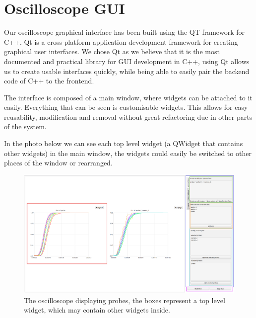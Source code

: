 \section{Oscilloscope GUI}
    Our oscilloscope graphical interface has been built using the QT framework for C++. Qt is a cross-platform application development framework for creating graphical user interfaces. \cite{qt-w} 
    We chose Qt as we believe that it is the most documented and practical library for GUI development in C++, using Qt allows us to create usable interfaces quickly, while being able to easily pair the backend code of C++ to the frontend.

    The interface is composed of a main window, where widgets can be attached to it easily. Everything that can be seen is customisable widgets. This allows for easy reusability, modification and removal without great refactoring due in other parts of the system.

    In the photo below we can see each top level widget (a QWidget that contains other widgets) in the main window, the widgets could easily be switched to other places of the window or rearranged.
    \begin{figure}[H]
        \begin{center}
            \includegraphics[width=\textwidth]{img/osc_an.png}
        \end{center}
        \caption{The oscilloscope displaying probes, the boxes represent a top level widget, which may contain other widgets inside.}
    \end{figure}
